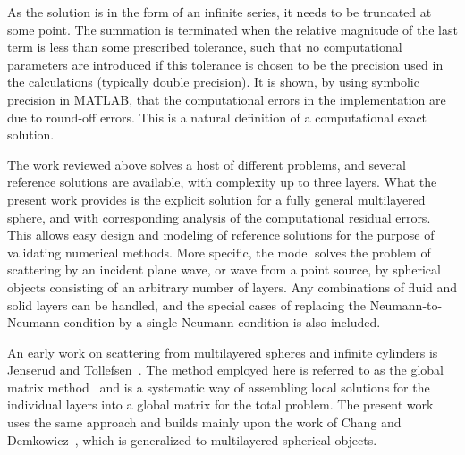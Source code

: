 As the solution is in the form of an infinite series, it needs to be truncated at some point. The summation is terminated when the relative magnitude of the last term is less than some prescribed tolerance, such that no computational parameters are introduced if this tolerance is chosen to be the precision used in the calculations (typically double precision). It is shown, by using symbolic precision in MATLAB, that the computational errors in the implementation are due to round-off errors. This is a natural definition of a computational exact solution.

The work reviewed above solves a host of different problems, and several reference solutions are available, with complexity up to three layers. What the present work provides is the explicit solution for a fully general multilayered sphere, and with corresponding analysis of the computational residual errors. This allows easy design and modeling of reference solutions for the purpose of validating numerical methods.
More specific, the model solves the problem of scattering by an incident plane wave, or wave from a point source, by spherical objects consisting of an arbitrary number of layers. Any combinations of fluid and solid layers can be handled, and the special cases of replacing the Neumann-to-Neumann condition by a single Neumann condition is also included.



   

An early work on scattering from multilayered spheres and infinite cylinders is Jenserud and Tollefsen~\cite{Jenserud1990ars}. The method employed here is referred to as the global matrix method~\cite{Schmidt1985afw} and is a systematic way of assembling local solutions for the individual layers into a global matrix for the total problem. 
The present work uses the same approach and builds mainly upon the work of Chang and Demkowicz~\cite{Chang1994voa}, which is generalized to multilayered spherical objects.


